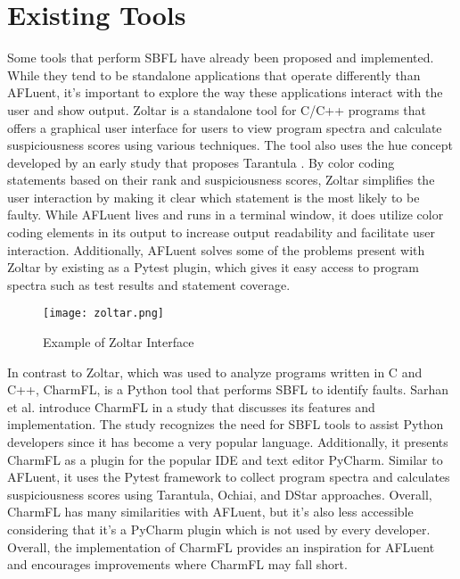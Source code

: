 \section{Existing Tools}
\label{sec:existing_tools}

Some tools that perform SBFL have already been proposed and implemented. While
they tend to be standalone applications that operate differently than AFLuent,
it's important to explore the way these applications interact with the user and
show output. Zoltar \cite{janssen2009zoltar} is a standalone tool for C/C++
programs that offers a
graphical user interface for users to view program spectra and calculate
suspiciousness scores using various techniques. The tool also uses the hue
concept developed by an early study that proposes Tarantula \cite{jones2002viz}.
By color coding statements based on their rank and suspiciousness scores, Zoltar
simplifies the user interaction by making it clear which statement is the most
likely to be faulty. While AFLuent lives and runs in a terminal window, it does
utilize color coding elements in its output to increase output readability and
facilitate user interaction. Additionally, AFLuent solves some of the problems
present with Zoltar by existing as a Pytest plugin, which gives it easy access
to program spectra such as test results and statement coverage.

\begin{figure}[!htb]
	\begin{center}
		\texttt{[image: zoltar.png]}
		\caption{\label{fig:zoltar} Example of Zoltar Interface \cite{janssen2009zoltar}}
	\end{center}
\end{figure}

In contrast to Zoltar, which was used to analyze programs written in C and C++,
CharmFL, is a Python tool that performs SBFL to identify faults. Sarhan et al.
\cite{sarhan2021charmfl} introduce CharmFL in a study that
discusses its features and implementation. The study recognizes the need for
SBFL tools to assist Python developers since it has become a very popular
language. Additionally, it presents CharmFL as a plugin for the popular IDE and
text editor PyCharm. Similar to AFLuent, it uses the Pytest framework to collect
program spectra and calculates suspiciousness scores using Tarantula, Ochiai,
and DStar approaches. Overall, CharmFL has many similarities with AFLuent, but
it's also less accessible considering that it's a PyCharm plugin which is not
used by every developer. Overall, the implementation of CharmFL provides an
inspiration for AFLuent and encourages improvements where CharmFL may fall
short.


